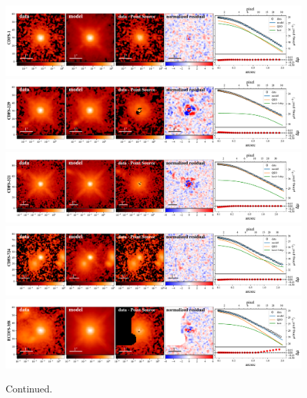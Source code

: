\documentclass[apj]{emulateapj}
\begin{document}
\begin{figure}
\centering
{
\includegraphics[height=0.25\textwidth]{fig/best_fit_CDFS-1_SB_profile.pdf}
\includegraphics[height=0.25\textwidth]{fig/best_fit_CDFS-229_SB_profile.pdf}
\includegraphics[height=0.25\textwidth]{fig/best_fit_CDFS-321_SB_profile.pdf}
\includegraphics[height=0.25\textwidth]{fig/best_fit_CDFS-724_SB_profile.pdf}
\includegraphics[height=0.25\textwidth]{fig/best_fit_ECDFS-358_SB_profile.pdf}
}
\caption{Continued.}
\end{figure} 
\end{document}
